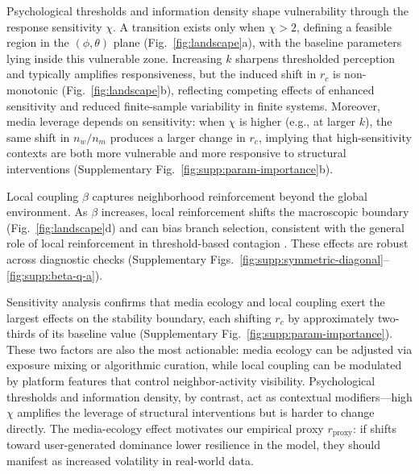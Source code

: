 \documentclass[preprint,12pt]{elsarticle}
\begin{document}
Psychological thresholds and information density shape vulnerability through the response sensitivity $\chi$. A transition exists only when $\chi>2$, defining a feasible region in the $(\phi,\theta)$ plane (Fig.~\ref{fig:landscape}a), with the baseline parameters lying inside this vulnerable zone. Increasing $k$ sharpens thresholded perception and typically amplifies responsiveness, but the induced shift in $r_c$ is non-monotonic (Fig.~\ref{fig:landscape}b), reflecting competing effects of enhanced sensitivity and reduced finite-sample variability in finite systems.
Moreover, media leverage depends on sensitivity: when $\chi$ is higher (e.g., at larger $k$), the same shift in $n_w/n_m$ produces a larger change in $r_c$, implying that high-sensitivity contexts are both more vulnerable and more responsive to structural interventions (Supplementary Fig.~\ref{fig:supp:param-importance}b).

Local coupling $\beta$ captures neighborhood reinforcement beyond the global environment. As $\beta$ increases, local reinforcement shifts the macroscopic boundary (Fig.~\ref{fig:landscape}d) and can bias branch selection, consistent with the general role of local reinforcement in threshold-based contagion \cite{Granovetter1978,Centola2010,Iacopini2019}. These effects are robust across diagnostic checks (Supplementary Figs.~\ref{fig:supp:symmetric-diagonal}--\ref{fig:supp:beta-q-a}).

Sensitivity analysis confirms that media ecology and local coupling exert the largest effects on the stability boundary, each shifting $r_c$ by approximately two-thirds of its baseline value (Supplementary Fig.~\ref{fig:supp:param-importance}). These two factors are also the most actionable: media ecology can be adjusted via exposure mixing or algorithmic curation, while local coupling can be modulated by platform features that control neighbor-activity visibility. Psychological thresholds and information density, by contrast, act as contextual modifiers---high $\chi$ amplifies the leverage of structural interventions but is harder to change directly. The media-ecology effect motivates our empirical proxy $r_{\text{proxy}}$: if shifts toward user-generated dominance lower resilience in the model, they should manifest as increased volatility in real-world data.
\end{document}
